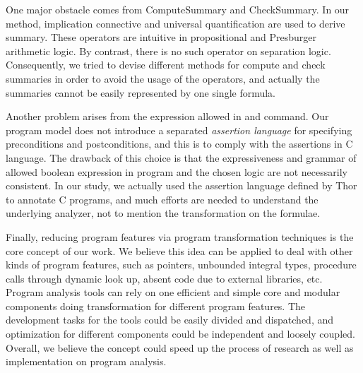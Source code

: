 One major obstacle comes from \textmd{ComputeSummary} and \textmd{CheckSummary}.
In our method, implication connective and universal quantification are used to
derive summary.
These operators are intuitive in propositional and Presburger arithmetic logic.
By contrast, there is no such operator on separation logic.
Consequently, we tried to devise different methods for compute and check
summaries in order to avoid the usage of the operators,
and actually the summaries cannot be easily represented by one single formula.

Another problem arises from the expression allowed in  and
 command.
Our program model does not introduce a separated \emph{assertion language} for
specifying preconditions and postconditions,
and this is to comply with the assertions in C language.
The drawback of this choice is that the expressiveness and grammar of allowed
boolean expression in program and the chosen logic are not necessarily
consistent.
In our study, we actually used the assertion language defined by Thor to
annotate C programs,
and much efforts are needed to understand the underlying analyzer,
not to mention the transformation on the formulae.

Finally, reducing program features via program transformation techniques is the
core concept of our work.
We believe this idea can be applied to deal with other kinds of program
features, such as pointers, unbounded integral types, procedure calls through
dynamic look up, absent code due to external libraries, etc.
Program analysis tools can rely on one efficient and simple core
 and modular components doing transformation for different
program features.
The development tasks for the tools could be easily divided and dispatched,
and optimization for different components could be independent and loosely
coupled.
Overall, we believe the concept could speed up the process of research as well
as implementation on program analysis.
